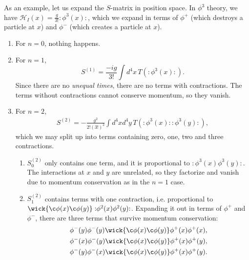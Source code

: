 \documentclass{article}
\numberwithin{equation}{section}
\newcommand{\normord}[1]{:\mathrel{#1}:}
\begin{document}
As an example, let us expand the $S$-matrix in position space. In $\phi^3$ theory, we have $\mathcal{H}_I(x) = \frac{g}{3!}\normord{\phi^3(x)}$, which we expand in terms of $\phi^+$ (which destroys a particle at $x$) and $\phi^-$ (which creates a particle at $x$).

\begin{enumerate}
    \item For $n=0$, nothing happens.
    \item For $n=1$,
    \begin{equation}
        S^{(1)} =\frac{-ig}{3!} \int d^4x \, T(\normord{\phi^3(x)}).
    \end{equation}
        Since there are no \textit{unequal times}, there are no terms with contractions. The terms without contractions cannot conserve momentum, so they vanish.
    \item For $n=2$,
    \begin{equation}
        \begin{aligned}
            S^{(2)} = -\frac{g^2}{2!(3!)^2} \int d^4x d^4y \, T\left(\normord{\phi^3(x)}\normord{\phi^3(y)}\right),
        \end{aligned}
    \end{equation}
        which we may split up into terms containing zero, one, two and three contractions.
    \begin{enumerate}
        \item $S_0^{(2)}$ only contains one term, and it is proportional to $\normord{\phi^3(x)\phi^3(y)}$. The interactions at $x$ and $y$ are unrelated, so they factorize and vanish due to momentum conservation as in the $n=1$ case.
        \item $S_1^{(2)}$ contains terms with one contraction, i.e. proportional to $\wick{\c\phi(x) \c\phi(y)} \normord{\phi^2(x) \phi^2(y)}$. Expanding it out in terms of $\phi^+$ and $\phi^-$, there are three terms that survive momentum conservation:
        \begin{equation} \label{eq:s12}
            \begin{aligned}
                \phi^-(y)\phi^-(y)\wick{\c\phi(x) \c\phi(y)}\phi^+(x)\phi^+(x), \\
                \phi^-(x)\phi^-(y)\wick{\c\phi(x) \c\phi(y)}\phi^+(x)\phi^+(y), \\
                \phi^-(y)\phi^-(x)\wick{\c\phi(x) \c\phi(y)}\phi^+(x)\phi^+(y).
            \end{aligned}
        \end{equation}

\end{enumerate}
\end{enumerate}
\end{document}
